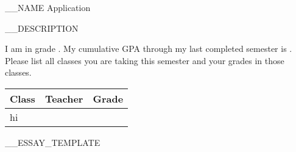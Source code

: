 \begin{center}
  \LARGE __NAME Application
\end{center}
__DESCRIPTION
\begin{questions}
  \question I am in grade \fillin.
  \question My cumulative GPA through my last completed semester is \fillin.
  \question Please list all classes you are taking this semester and your grades in those classes. \\
  \begin{tabularx}{.9\textwidth}{X|X|r}
    Class & Teacher & Grade \\ \hline
    \parbox[][2in]{0pt}{hi} & & \\
  \end{tabularx}
  __ESSAY_TEMPLATE
  
  \thispagestyle{empty} %
\end{questions}
\pagebreak